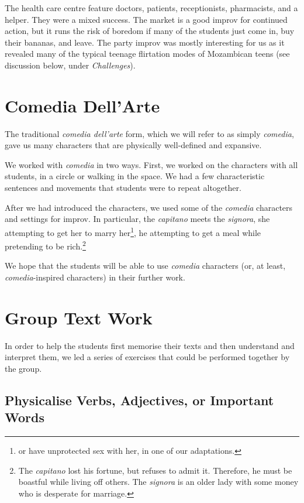 \documentclass[article,twocolumn,twoside]{memoir}
\begin{document}
The health care centre feature doctors, patients, receptionists, pharmacists,
and a helper. They were a mixed success. The market is a good improv for
continued action, but it runs the risk of boredom if many of the students just
come in, buy their bananas, and leave. The party improv was mostly interesting
for us as it revealed many of the typical teenage flirtation modes of
Mozambican teens (see discussion below, under \emph{Challenges}).

\section{Comedia Dell'Arte}

The traditional \textit{comedia dell'arte} form, which we will refer to as
simply \textit{comedia}, gave us many characters that are physically
well-defined and expansive.

We worked with \textit{comedia} in two ways. First, we worked on the characters
with all students, in a circle or walking in the space. We had a few
characteristic sentences and movements that students were to repeat altogether.

After we had introduced the characters, we used some of the \textit{comedia}
characters and settings for improv. In particular, the \textit{capitano} meets
the \textit{signora}, she attempting to get her to marry her\footnote{or have
unprotected sex with her, in one of our adaptations.}, he attempting to get a
meal while pretending to be rich.\footnote{The \textit{capitano} lost his
fortune, but refuses to admit it. Therefore, he must be boastful while living
off others. The \textit{signora} is an older lady with some money who is
desperate for marriage.}

We hope that the students will be able to use \textit{comedia} characters (or,
at least, \textit{comedia}-inspired characters) in their further work.

\section{Group Text Work}

In order to help the students first memorise their texts and then understand
and interpret them, we led a series of exercises that could be performed
together by the group.

\subsection{Physicalise Verbs, Adjectives, or Important Words}
\end{document}
